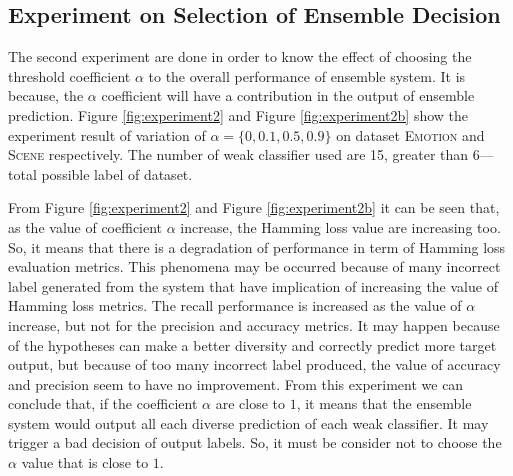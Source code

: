 \documentclass{article}
\begin{document}
\subsection{Experiment on Selection of Ensemble Decision}
\label{expr2}


The second experiment are done in order to know the effect of choosing the threshold coefficient $\alpha$ to the overall performance of ensemble system. It is because, the $\alpha$ coefficient will have a contribution in the output of ensemble prediction. Figure \ref{fig:experiment2} and Figure \ref{fig:experiment2b} show the experiment result of variation of $\alpha = \{0, 0.1, 0.5, 0.9\}$ on dataset \textsc{Emotion} and \textsc{Scene} respectively. The number of weak classifier used are 15, greater than 6---total possible label of dataset.


From Figure \ref{fig:experiment2} and Figure \ref{fig:experiment2b} it can be seen that, as the value of coefficient $\alpha$ increase, the Hamming loss value are increasing too. So, it means that there is a degradation of performance in term of Hamming loss evaluation metrics. This phenomena may be occurred because of many incorrect label generated from the system that have implication of increasing the value of Hamming loss metrics. The recall performance is increased as the value of $\alpha$ increase, but not for the precision and accuracy metrics. It may happen because of the hypotheses can make a better diversity and correctly predict more target output, but because of too many incorrect label produced, the value of accuracy and precision seem to have no improvement. From this experiment we can conclude that, if the coefficient $\alpha$ are close to $1$, it means that the ensemble system would output all each diverse prediction of each weak classifier. It may trigger a bad decision of output labels. So, it must be consider not to choose the $\alpha$ value that is close to $1$.
\end{document}
